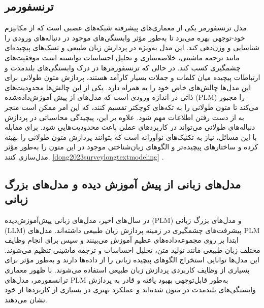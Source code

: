 \subsection{ترنسفورمر}
مدل ترنسفورمر یکی از معماری‌های پیشرفته شبکه‌های عصبی است که از مکانیزم خود-توجهی
   بهره می‌برد تا به‌طور مؤثر وابستگی‌های موجود در دنباله‌های ورودی را شناسایی و وزن‌دهی کند. این مدل به‌ویژه در پردازش زبان طبیعی و تسک‌های پیچیده‌ای مانند ترجمه ماشینی، خلاصه‌سازی و تحلیل احساسات توانسته است موفقیت‌های چشمگیری کسب کند. در حالی که ترنسفورمرها در درک وابستگی‌های بلندمدت و ارتباطات پیچیده میان کلمات و جملات بسیار کارآمد هستند، پردازش متون طولانی برای این مدل‌ها چالش‌های خاص خود را به همراه دارد. یکی از این چالش‌ها محدودیت‌های ذاتی در اندازه ورودی است که مدل‌های از پیش آموزش‌داده‌شده (PLM) را مجبور می‌کند تا متون طولانی را به تکه‌های کوچکتر تقسیم کنند، که این امر ممکن است منجر به از دست رفتن اطلاعات مهم شود. علاوه بر این، پیچیدگی محاسباتی در پردازش دنباله‌های طولانی می‌تواند در کاربردهای عملی باعث محدودیت‌هایی شود. برای مقابله با این مسائل، نیاز به تکنیک‌های نوآورانه است که بتوانند پردازش متون طولانی را بهینه کرده و ساختارهای پیچیده‌تر و الگوهای زبان‌شناختی موجود در این متون را به‌طور مؤثر مدل‌سازی کنند.
 \ref{dong2023surveylongtextmodeling} .





\subsection{ مدل‌های زبانی از پیش آموزش دیده و مدل‌های بزرگ زبانی}
در سال‌های اخیر، مدل‌های زبانی پیش‌آموزش‌دیده (PLM) و مدل‌های بزرگ زبانی (LLM) پیشرفت‌های چشمگیری در زمینه پردازش زبان طبیعی داشته‌اند. مدل‌های PLM ابتدا بر روی مجموعه‌داده‌های عظیم آموزش می‌بینند و سپس برای انجام وظایف مختلف زبان طبیعی مانند تولید متن، تحلیل احساسات و ترجمه ماشینی تنظیم می‌شوند. این مدل‌ها توانایی استخراج الگوهای پیچیده زبانی را از داده‌ها دارند و به‌طور مؤثر برای بسیاری از وظایف کاربردی پردازش زبان طبیعی استفاده می‌شوند. با ظهور معماری ترانسفورمر، مدل‌های PLM به‌طور قابل‌توجهی بهبود یافته و قادر به پردازش وابستگی‌های بلندمدت در متون شده‌اند و عملکرد بهتری در بسیاری از کاربردها از خود نشان می‌دهند.

